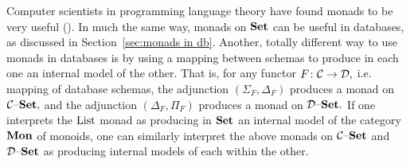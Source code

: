 \documentclass[../main/CT4S-EN-RU]{subfiles}
\begin{document}
\begin{blockENG}
Computer scientists in programming language theory have found monads to be very useful (\cite{Mog}). In much the same way, monads on ${\mathbf{Set}}$ can be useful in databases, as discussed in Section~\ref{sec:monads in db}. Another, totally different way to use monads in databases is by using a mapping between schemas to produce in each one an internal model of the other. That is, for any functor $F\colon\mathcal{C}\rightarrow\mathcal{D},$ i.e. mapping of database schemas, the adjunction $(\Sigma_F,\Delta_F)$ produces a monad on $\mathcal{C}{\text \textendash}{\mathbf{Set}},$ and the adjunction $(\Delta_F,\Pi_F)$ produces a monad on $\mathcal{D}{\text \textendash}{\mathbf{Set}}.$ If one interprets the $\operatorname{List}$ monad as producing in ${\mathbf{Set}}$ an internal model of the category ${\mathbf{Mon}}$ of monoids, one can similarly interpret the above monads on $\mathcal{C}{\text \textendash}{\mathbf{Set}}$ and $\mathcal{D}{\text \textendash}{\mathbf{Set}}$ as producing internal models of each within the other.
\end{blockENG}

\begin{blockRUS}
\end{blockRUS}
\end{document}
